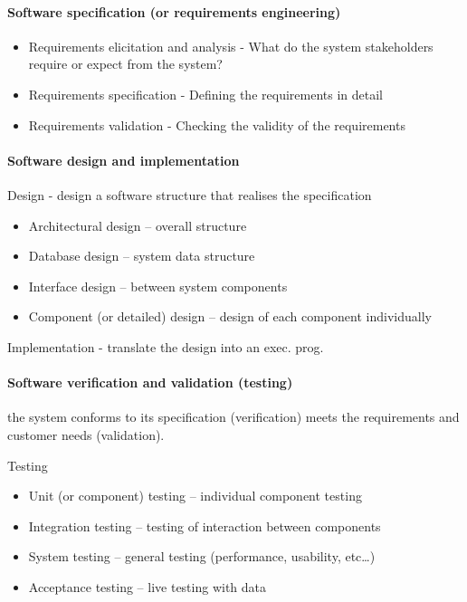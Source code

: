 \documentclass[../ESOF_notes.tex]{subfiles}
\begin{document}
\paragraph{Software specification (or requirements engineering)}
\begin{itemize}
    \item Requirements elicitation and analysis - What do the system stakeholders require or expect from the system?
    \item Requirements specification - Defining the requirements in detail
    \item Requirements validation - Checking the validity of the requirements
\end{itemize}

\paragraph{Software design and implementation}

Design - design a software structure that realises the specification

\begin{itemize}
    \item Architectural design – overall structure
    \item Database design – system data structure
    \item Interface design – between system components
    \item Component (or detailed) design – design of each component individually
\end{itemize}

Implementation - translate the design into an exec. prog.

\paragraph{Software verification and validation (testing)}
the system conforms to its specification (verification)
meets the requirements and customer needs (validation).

Testing

\begin{itemize}
    \item Unit (or component) testing – individual component testing
    \item Integration testing – testing of interaction between components
    \item System testing – general testing (performance, usability, etc…)
    \item Acceptance testing – live testing with data
\end{itemize}
\end{document}
